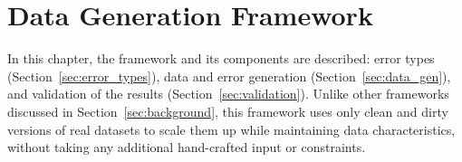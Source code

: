 \chapter{Data Generation Framework}
\label{sec:benchmark}
In this chapter, the framework and its components are described: error types (Section~\ref{sec:error_types}), data and error generation (Section~\ref{sec:data_gen}), and validation of the results (Section~\ref{sec:validation}).
Unlike other frameworks discussed in Section~\ref{sec:background}, this framework uses only clean and dirty versions of real datasets to scale them up while maintaining data characteristics, without taking any additional hand-crafted input or constraints.




